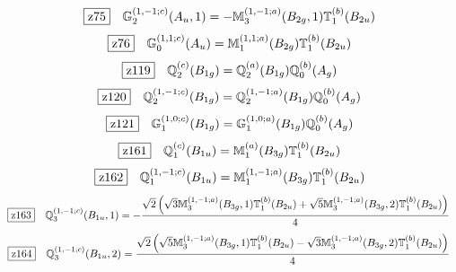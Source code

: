 \documentclass[fleqn,10pt,landscape]{jsarticle}
\begin{document}
\begin{dmath*}
\hspace*{3mm}\fbox{z75}\quad \mathbb{G}_{2}^{(1,-1;c)}(A_{u},1)=- \mathbb{M}_{3}^{(1,-1;a)}(B_{2g},1) \mathbb{T}_{1}^{(b)}(B_{2u})
\end{dmath*}
\begin{dmath*}
\hspace*{3mm}\fbox{z76}\quad \mathbb{G}_{0}^{(1,1;c)}(A_{u})=\mathbb{M}_{1}^{(1,1;a)}(B_{2g}) \mathbb{T}_{1}^{(b)}(B_{2u})
\end{dmath*}
\begin{dmath*}
\hspace*{3mm}\fbox{z119}\quad \mathbb{Q}_{2}^{(c)}(B_{1g})=\mathbb{Q}_{2}^{(a)}(B_{1g}) \mathbb{Q}_{0}^{(b)}(A_{g})
\end{dmath*}
\begin{dmath*}
\hspace*{3mm}\fbox{z120}\quad \mathbb{Q}_{2}^{(1,-1;c)}(B_{1g})=\mathbb{Q}_{2}^{(1,-1;a)}(B_{1g}) \mathbb{Q}_{0}^{(b)}(A_{g})
\end{dmath*}
\begin{dmath*}
\hspace*{3mm}\fbox{z121}\quad \mathbb{G}_{1}^{(1,0;c)}(B_{1g})=\mathbb{G}_{1}^{(1,0;a)}(B_{1g}) \mathbb{Q}_{0}^{(b)}(A_{g})
\end{dmath*}
\begin{dmath*}
\hspace*{3mm}\fbox{z161}\quad \mathbb{Q}_{1}^{(c)}(B_{1u})=\mathbb{M}_{1}^{(a)}(B_{3g}) \mathbb{T}_{1}^{(b)}(B_{2u})
\end{dmath*}
\begin{dmath*}
\hspace*{3mm}\fbox{z162}\quad \mathbb{Q}_{1}^{(1,-1;c)}(B_{1u})=\mathbb{M}_{1}^{(1,-1;a)}(B_{3g}) \mathbb{T}_{1}^{(b)}(B_{2u})
\end{dmath*}
\begin{dmath*}
\hspace*{3mm}\fbox{z163}\quad \mathbb{Q}_{3}^{(1,-1;c)}(B_{1u},1)=- \frac{\sqrt{2} \left(\sqrt{3} \mathbb{M}_{3}^{(1,-1;a)}(B_{3g},1) \mathbb{T}_{1}^{(b)}(B_{2u}) + \sqrt{5} \mathbb{M}_{3}^{(1,-1;a)}(B_{3g},2) \mathbb{T}_{1}^{(b)}(B_{2u})\right)}{4}
\end{dmath*}
\begin{dmath*}
\hspace*{3mm}\fbox{z164}\quad \mathbb{Q}_{3}^{(1,-1;c)}(B_{1u},2)=\frac{\sqrt{2} \left(\sqrt{5} \mathbb{M}_{3}^{(1,-1;a)}(B_{3g},1) \mathbb{T}_{1}^{(b)}(B_{2u}) - \sqrt{3} \mathbb{M}_{3}^{(1,-1;a)}(B_{3g},2) \mathbb{T}_{1}^{(b)}(B_{2u})\right)}{4}
\end{dmath*}
\end{document}
